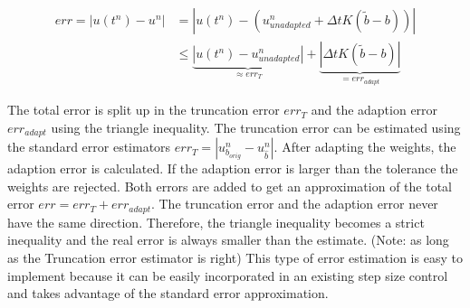 \documentclass[a4paper]{article}
\numberwithin{equation}{section}
\theoremstyle{plain}
\theoremstyle{definition}
\numberwithin{theorem}{section}
\newcommand{\dt}{{\Delta t}}
\newcommand{\1}{\mathbbm{1}}
\begin{document}
\begin{align}
err = |u(t^n)-u^n| &= |u(t^n) - (u^n_{unadapted}+\dt K(\tilde{b}-b))| \\
 &\leq \underbrace{|u(t^n)-u^n_{unadapted}|}_{\approx err_T}+\underbrace{|\dt K(\tilde{b}-b)|}_{= err_{adapt}} \label{eq:Err}
\end{align}

The total error is split up in the truncation error $err_T$ and the adaption error $err_{adapt}$ using the triangle inequality. 
The truncation error can be estimated using the standard error estimators $err_T = | u^{n}_{b_{orig}} - u^{n}_{\hat{b}} |$. 
After adapting the weights, the adaption error is calculated. If the adaption error is larger than the tolerance the weights are rejected.  
Both errors are added to get an approximation of the total error $err = err_T + err_{adapt}$.
The truncation error and the adaption error never have the same direction.  
Therefore, the triangle inequality becomes a strict inequality and the real error is always smaller than the estimate. (Note: as long as the Truncation error estimator is right) 
This type of error estimation is easy to implement because it can be easily incorporated in an existing step size control and takes advantage of the standard error approximation.

\end{document}

